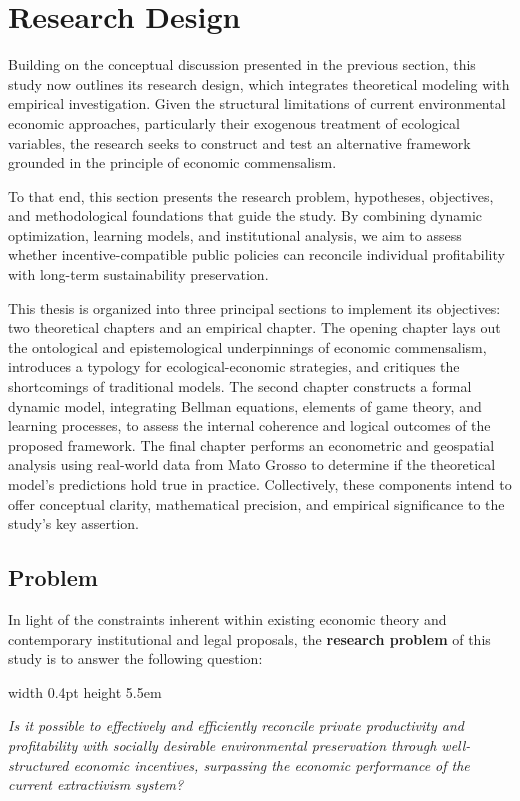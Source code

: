 \section{Research Design}

Building on the conceptual discussion presented in the previous section, this study now outlines its research design, which integrates theoretical modeling with empirical investigation. Given the structural limitations of current environmental economic approaches, particularly their exogenous treatment of ecological variables, the research seeks to construct and test an alternative framework grounded in the principle of economic commensalism.

To that end, this section presents the research problem, hypotheses, objectives, and methodological foundations that guide the study. By combining dynamic optimization, learning models, and institutional analysis, we aim to assess whether incentive-compatible public policies can reconcile individual profitability with long-term sustainability preservation.

This thesis is organized into three principal sections to implement its objectives: two theoretical chapters and an empirical chapter. The opening chapter lays out the ontological and epistemological underpinnings of economic commensalism, introduces a typology for ecological-economic strategies, and critiques the shortcomings of traditional models. The second chapter constructs a formal dynamic model, integrating Bellman equations, elements of game theory, and learning processes, to assess the internal coherence and logical outcomes of the proposed framework. The final chapter performs an econometric and geospatial analysis using real-world data from Mato Grosso to determine if the theoretical model's predictions hold true in practice. Collectively, these components intend to offer conceptual clarity, mathematical precision, and empirical significance to the study's key assertion.

\subsection{Problem}

In light of the constraints inherent within existing economic theory and contemporary institutional and legal proposals, the \textbf{research problem} of this study is to answer the following question: 
\vspace{1em}

\begin{flushright}
\begin{minipage}{0.93\linewidth}
\noindent
\hspace{0.4em}\vrule width 0.4pt height 5.5em \hspace{1.2em}%
\parbox[b]{0.95\linewidth}{
\textit{Is it possible to effectively and efficiently reconcile private productivity and profitability with socially desirable environmental preservation through well-structured economic incentives, surpassing the economic performance of the current extractivism system?}
}
\end{minipage}
\end{flushright}

